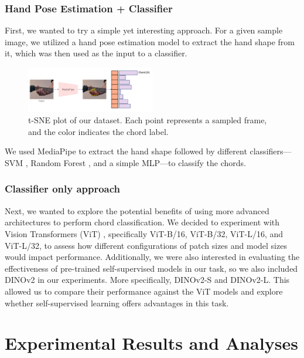 \documentclass[10pt,twocolumn,letterpaper]{article}
\begin{document}
\subsubsection{Hand Pose Estimation + Classifier}
First, we wanted to try a simple yet interesting approach. For a given sample image, we utilized a hand pose estimation model to extract the hand shape from it, which was then used as the input to a classifier.

\begin{figure}[h]
  \centering
  \includegraphics[width=0.5\textwidth]{images/final/hand_pose_estimation_classifier.png}
  \caption{t-SNE plot of our dataset. Each point represents a sampled frame, and the color indicates the chord label. }
  \label{fig:ours-tsne-plot}
\end{figure}

We used MediaPipe to extract the hand shape followed by different classifiers—SVM \cite{cortes1995support}, Random Forest \cite{ho1995random}, and a simple MLP—to classify the chords. 

\subsubsection{Classifier only approach}
Next, we wanted to explore the potential benefits of using more advanced architectures to perform chord classification. We decided to experiment with Vision Transformers (ViT) \cite{dosovitskiy2020image}, specifically ViT-B/16, ViT-B/32, ViT-L/16, and ViT-L/32, to assess how different configurations of patch sizes and model sizes would impact performance. Additionally, we were also interested in evaluating the effectiveness of pre-trained self-supervised models in our task, so we also included DINOv2 \cite{oquab2023dinov2} in our experiments. More specifically, DINOv2-S and DINOv2-L. This allowed us to compare their performance against the ViT models and explore whether self-supervised learning offers advantages in this task.

\section{Experimental Results and Analyses}
\label{sec:results}
\end{document}

